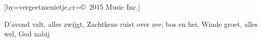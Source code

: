  

[by=vergeetmenietje,cr={\copyright~2015 Music Inc.}]




\beginverse
    D’avond valt, alles zwijgt,
    Zachtkens ruist over zee, bos en hei,
    Winde groet, alles wel,
    God nabij
\endverse




\endsong
